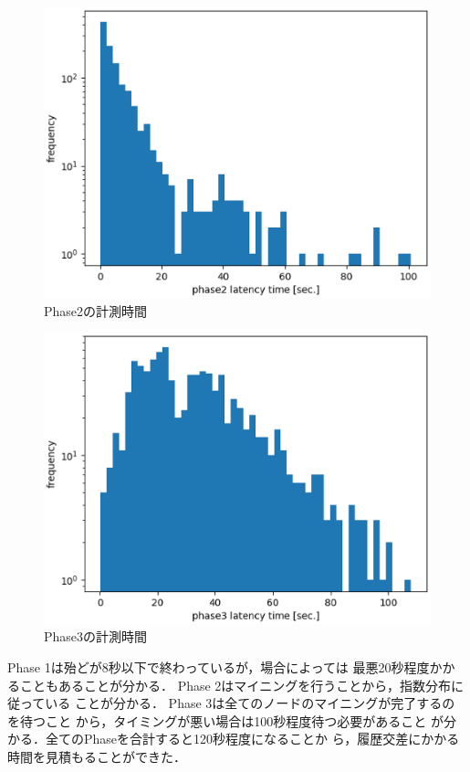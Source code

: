 \documentclass[a4paper,12pt]{jsarticle}
\begin{document}
\begin{figure}[tbh]
  \begin{center}
    \includegraphics{pht/phase2-sec-hist.eps}
  \end{center}
  \caption{Phase2の計測時間}
  \label{fig:phase2}
\end{figure}
%
%
\begin{figure}[tbh]
  \begin{center}
    \includegraphics{pht/phase3-sec-hist.eps}
  \end{center}
  \caption{Phase3の計測時間}
  \label{fig:phase3}
\end{figure}
%
Phase 1は殆どが8秒以下で終わっているが，場合によっては
最悪20秒程度かかることもあることが分かる．
Phase 2はマイニングを行うことから，指数分布に従っている
ことが分かる．
Phase 3は全てのノードのマイニングが完了するのを待つこと
から，タイミングが悪い場合は100秒程度待つ必要があること
が分かる．全てのPhaseを合計すると120秒程度になることか
ら，履歴交差にかかる時間を見積もることができた．
\end{document}

